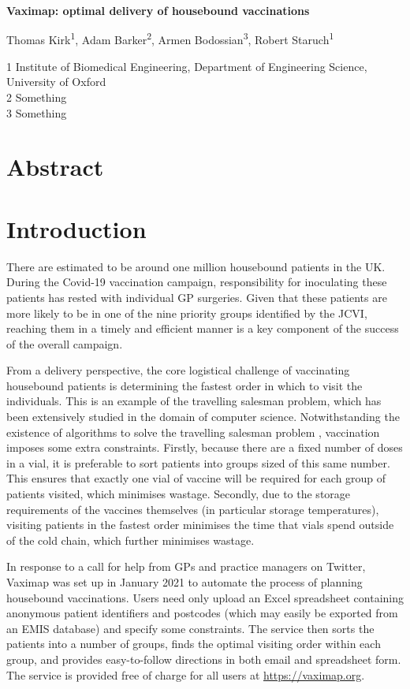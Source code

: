 \documentclass[11pt]{amsart}
\begin{document}
\begin{center}
\huge{\textbf{Vaximap: optimal delivery of housebound vaccinations}}

\large{Thomas Kirk\textsuperscript{1}, Adam Barker\textsuperscript{2}, Armen Bodossian\textsuperscript{3}, Robert Staruch\textsuperscript{1}}

\small{1 Institute of Biomedical Engineering, Department of Engineering Science, University of Oxford\\
2 Something\\
3 Something}

\end{center}

\section{Abstract}

\section{Introduction}

There are estimated to be around one million housebound patients in the UK. During the Covid-19 vaccination campaign, responsibility for inoculating these patients has rested with individual GP surgeries. Given that these patients are more likely to be in one of the nine priority groups identified by the JCVI, reaching them in a timely and efficient manner is a key component of the success of the overall campaign. 

From a delivery perspective, the core logistical challenge of vaccinating housebound patients is determining the fastest order in which to visit the individuals. This is an example of the travelling salesman problem, which has been extensively studied in the domain of computer science. Notwithstanding the existence of algorithms to solve the travelling salesman problem \cite{X}, vaccination imposes some extra constraints. Firstly, because there are a fixed number of doses in a vial, it is preferable to sort patients into groups sized of this same number. This ensures that exactly one vial of vaccine will be required for each group of patients visited, which minimises wastage. Secondly, due to the storage requirements of the vaccines themselves (in particular storage temperatures), visiting patients in the fastest order minimises the time that vials spend outside of the cold chain, which further minimises wastage. 

In response to a call for help from GPs and practice managers on Twitter, Vaximap was set up in January 2021 to automate the process of planning housebound vaccinations. Users need only upload an Excel spreadsheet containing anonymous patient identifiers and postcodes (which may easily be exported from an EMIS database) and specify some constraints. The service then sorts the patients into a number of groups, finds the optimal visiting order within each group, and provides easy-to-follow directions in both email and spreadsheet form. The service is provided free of charge for all users at \url{https://vaximap.org}. 
\end{document}
